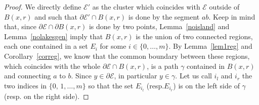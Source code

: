 \documentclass[11pt]{article}
\newcommand{\resp}{resp.\xspace}
\numberwithin{equation}{section}
\newcommand\E{\mathcal{E}}
\theoremstyle{plain}
\theoremstyle{definition}
\begin{document}
\begin{proof}
We directly define $\E'$ as the cluster which coincides with $\E$ outside of $B(x,r)$ and such that $\partial\E'\cap B(x,r)$ is done by the segment $ab$. Keep in mind that, since $\partial\E\cap \partial B(x,r)$ is done by two points, Lemma~\ref{noisland} and Lemma~\ref{nolakesgen} imply that $B(x,r)$ is the union of two connected regions, each one contained in a set $E_i$ for some $i\in\{0,\dots,m\}$. By Lemma~\ref{lem1reg} and Corollary~\ref{correg}, we know that the common boundary between these regions, which coincides with the whole $\partial\E\cap B(x,r)$, is a path $\gamma$ contained in $B(x,r)$ and connecting $a$ to $b$. Since $y\in\partial\E$, in particular $y\in\gamma$. Let us call $i_l$ and $i_r$ the two indices in $\{0,\, 1 ,\dots, m\}$ so that the set $E_{i_l}$ (\resp $E_{i_r}$) is on the left side of $\gamma$ (\resp on the right side).


\end{proof}
\end{document}
